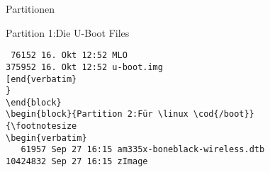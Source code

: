 \begin{frame}[fragile]{Partitionen}
\begin{block}{Partition 1:Die U-Boot Files}
{\footnotesize
\begin{verbatim}
 76152 16. Okt 12:52 MLO
375952 16. Okt 12:52 u-boot.img
[end{verbatim}
}
\end{block}
\begin{block}{Partition 2:Für \linux \cod{/boot}}
{\footnotesize
\begin{verbatim}
   61957 Sep 27 16:15 am335x-boneblack-wireless.dtb
10424832 Sep 27 16:15 zImage
\end{verbatim}
}
\end{block}
\end{frame}

